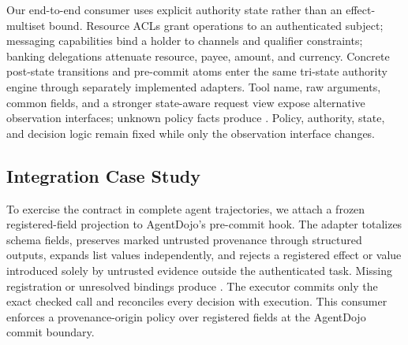Our end-to-end consumer uses explicit authority state rather than an
effect-multiset bound.  Resource ACLs grant operations to an authenticated
subject; messaging capabilities bind a holder to channels and qualifier
constraints; banking delegations attenuate resource, payee, amount, and
currency.  Concrete post-state transitions and pre-commit atoms enter the same
tri-state authority engine through separately implemented adapters. Tool name,
raw arguments, common fields, and a stronger state-aware request view expose
alternative observation interfaces;
unknown policy facts produce \Abstain{}.  Policy, authority, state, and decision
logic remain fixed while only the observation interface changes.

\subsection{Integration Case Study}

To exercise the contract in complete agent trajectories, we attach a frozen
registered-field projection to AgentDojo's pre-commit hook.  The adapter
totalizes schema fields, preserves marked untrusted provenance through
structured outputs, expands list values independently, and rejects a registered
effect or value introduced solely by untrusted evidence outside the
authenticated task. Missing registration or unresolved bindings produce
\Abstain{}. The executor commits only the exact checked call and reconciles
every decision with execution. This consumer enforces a provenance-origin
policy over registered fields at the AgentDojo commit boundary.
